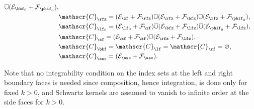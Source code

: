 \begin{Th}
\begin{equation}
\begin{split}
\overline{\cup} (\mathcal{E}_{\bbf_0} + \mathcal{F}_{\phif_0}), \\
&\mathscr{C}_{\rfz} =
(\mathcal{E}_{\zf} + \mathcal{F}_{\rfz})
\overline{\cup} (\mathcal{E}_{\rfz}+ \mathcal{F}_{\bfz})
\overline{\cup} (\mathcal{E}_{\rfz}+\mathcal{F}_{\phif_0}),\\
&\mathscr{C}_{\lf_{0}} = (\mathcal{E}_{\lf_0}+
\mathcal{F}_{\zf}) \overline{\cup}
(\mathcal{E}_{\bfz}+\mathcal{F}_{\lfz}) \overline{\cup}
(\mathcal{E}_{\phif_0}+ \mathcal{F}_{\lfz}),\\
&\mathscr{C}_{\zf} = (\mathcal{E}_{\zf}+ \mathcal{F}_{\zf}) \overline{\cup}
(\mathcal{E}_{\rfz}+ \mathcal{F}_{\lfz}), \\
&\mathscr{C}_{\bbf} =
\mathscr{C}_{\lf} = \mathscr{C}_{\rf}
= \varnothing, \\
&\mathscr{C}_{\ssc} = (\mathcal{E}_{\ssc} + \mathcal{F}_{\ssc}).
\end{split}
\end{equation}
\end{Th}
{Note that no integrability condition on the index sets at the left and right boundary faces is needed since composition, hence integration, is done only for fixed $k>0$, and Schwartz kernels are assumed to vanish to infinite order at the side faces for $k>0$.}

